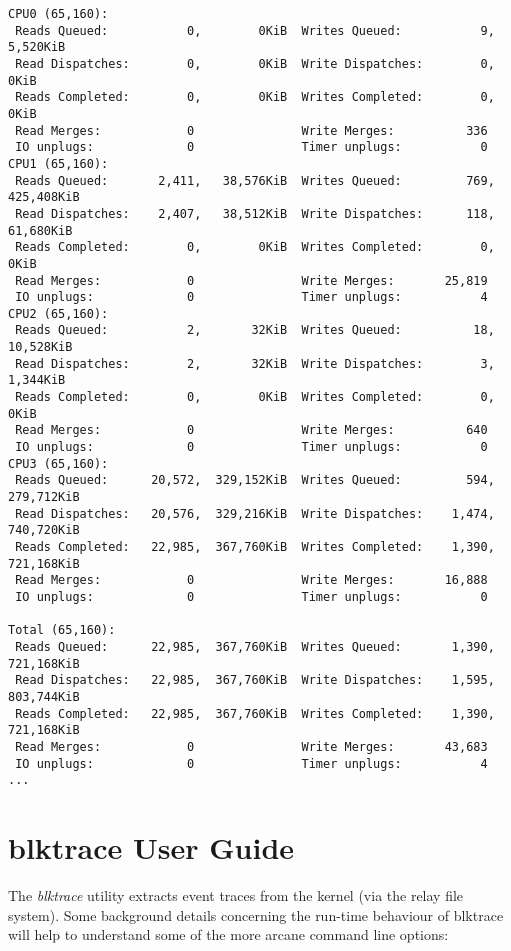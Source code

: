 \documentclass{article}
\begin{document}
\begin{verbatim}
CPU0 (65,160):
 Reads Queued:           0,        0KiB  Writes Queued:           9,    5,520KiB
 Read Dispatches:        0,        0KiB  Write Dispatches:        0,        0KiB
 Reads Completed:        0,        0KiB  Writes Completed:        0,        0KiB
 Read Merges:            0               Write Merges:          336
 IO unplugs:             0               Timer unplugs:           0
CPU1 (65,160):
 Reads Queued:       2,411,   38,576KiB  Writes Queued:         769,  425,408KiB
 Read Dispatches:    2,407,   38,512KiB  Write Dispatches:      118,   61,680KiB
 Reads Completed:        0,        0KiB  Writes Completed:        0,        0KiB
 Read Merges:            0               Write Merges:       25,819
 IO unplugs:             0               Timer unplugs:           4
CPU2 (65,160):
 Reads Queued:           2,       32KiB  Writes Queued:          18,   10,528KiB
 Read Dispatches:        2,       32KiB  Write Dispatches:        3,    1,344KiB
 Reads Completed:        0,        0KiB  Writes Completed:        0,        0KiB
 Read Merges:            0               Write Merges:          640
 IO unplugs:             0               Timer unplugs:           0
CPU3 (65,160):
 Reads Queued:      20,572,  329,152KiB  Writes Queued:         594,  279,712KiB
 Read Dispatches:   20,576,  329,216KiB  Write Dispatches:    1,474,  740,720KiB
 Reads Completed:   22,985,  367,760KiB  Writes Completed:    1,390,  721,168KiB
 Read Merges:            0               Write Merges:       16,888
 IO unplugs:             0               Timer unplugs:           0

Total (65,160):
 Reads Queued:      22,985,  367,760KiB  Writes Queued:       1,390,  721,168KiB
 Read Dispatches:   22,985,  367,760KiB  Write Dispatches:    1,595,  803,744KiB
 Reads Completed:   22,985,  367,760KiB  Writes Completed:    1,390,  721,168KiB
 Read Merges:            0               Write Merges:       43,683
 IO unplugs:             0               Timer unplugs:           4
...
\end{verbatim}

\newpage\section{\label{sec:blktrace-ug}blktrace User Guide}

The \emph{blktrace} utility extracts event traces from the kernel (via
the relay file system). Some background details concerning the run-time
behaviour of blktrace will help to understand some of the more arcane
command line options:
\end{document}
